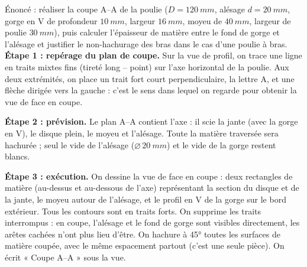 \documentclass[11pt]{article}
\begin{document}
\begin{exoresolu}
Énoncé : réaliser la coupe A--A de la poulie ($D = \SI{120}{mm}$, alésage $d = \SI{20}{mm}$, gorge en V de profondeur $\SI{10}{mm}$, largeur $\SI{16}{mm}$, moyeu de $\SI{40}{mm}$, largeur de poulie $\SI{30}{mm}$), puis calculer l'épaisseur de matière entre le fond de gorge et l'alésage et justifier le non-hachurage des bras dans le cas d'une poulie à bras.
\tcblower
\textbf{Étape 1 : repérage du plan de coupe.} Sur la vue de profil, on trace une ligne en traits mixtes fins (tireté long -- point) sur l'axe horizontal de la poulie. Aux deux extrémités, on place un trait fort court perpendiculaire, la lettre A, et une flèche dirigée vers la gauche : c'est le sens dans lequel on regarde pour obtenir la vue de face en coupe.

\textbf{Étape 2 : prévision.} Le plan A--A contient l'axe : il scie la jante (avec la gorge en V), le disque plein, le moyeu et l'alésage. Toute la matière traversée sera hachurée ; seul le vide de l'alésage ($\varnothing\,\SI{20}{mm}$) et le vide de la gorge restent blancs.

\textbf{Étape 3 : exécution.} On dessine la vue de face en coupe : deux rectangles de matière (au-dessus et au-dessous de l'axe) représentant la section du disque et de la jante, le moyeu autour de l'alésage, et le profil en V de la gorge sur le bord extérieur. Tous les contours sont en traits forts. On supprime les traits interrompus : en coupe, l'alésage et le fond de gorge sont visibles directement, les arêtes cachées n'ont plus lieu d'être. On hachure à 45° toutes les surfaces de matière coupée, avec le même espacement partout (c'est une seule pièce). On écrit « Coupe A--A » sous la vue.


\end{exoresolu}
\end{document}
